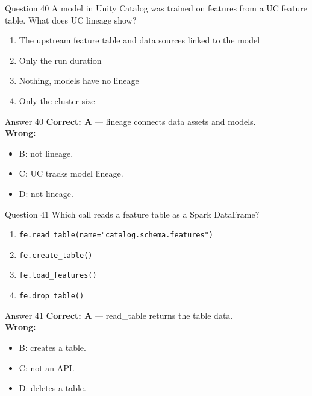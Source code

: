 \documentclass[aspectratio=169,11pt]{beamer}
\begin{document}
\begin{frame}{Question 40}
A model in Unity Catalog was trained on features from a UC feature table. What does UC lineage show?
\begin{enumerate}[label=\Alph*.]
\item The upstream feature table and data sources linked to the model
\item Only the run duration
\item Nothing, models have no lineage
\item Only the cluster size
\end{enumerate}
\end{frame}
\begin{frame}{Answer 40}
\textbf{Correct: A} --- lineage connects data assets and models.\\
\vspace{0.5em}
\textbf{Wrong:}
\begin{itemize}
\item B: not lineage.
\item C: UC tracks model lineage.
\item D: not lineage.
\end{itemize}
\end{frame}

\begin{frame}{Question 41}
Which call reads a feature table as a Spark DataFrame?
\begin{enumerate}[label=\Alph*.]
\item \texttt{fe.read\_table(name="catalog.schema.features")}
\item \texttt{fe.create\_table()}
\item \texttt{fe.load\_features()}
\item \texttt{fe.drop\_table()}
\end{enumerate}
\end{frame}
\begin{frame}{Answer 41}
\textbf{Correct: A} --- read\_table returns the table data.\\
\vspace{0.5em}
\textbf{Wrong:}
\begin{itemize}
\item B: creates a table.
\item C: not an API.
\item D: deletes a table.
\end{itemize}
\end{frame}
\end{document}
